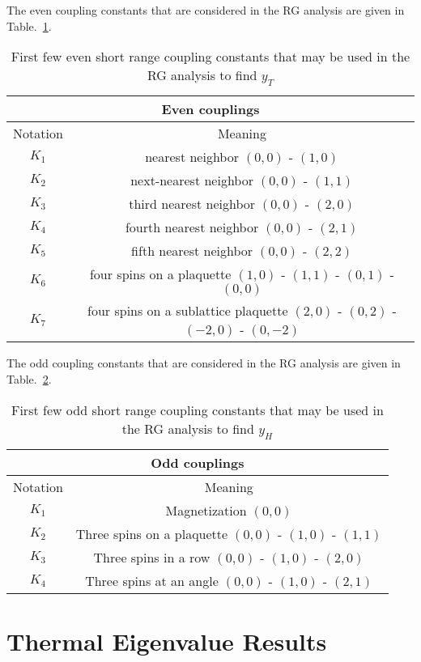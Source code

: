 \documentclass{article}
\begin{document}
The even coupling constants that are considered in the RG analysis
are given in Table.~\ref{even}. 

\begin{table}[H]
\centering
\begin{tabular}{|c |c|} 
 \hline
\multicolumn{2}{|c|}{Even couplings} \\ 
 \hline
 Notation & Meaning\\
 \hline
 $K_1$ & nearest neighbor $(0,0)$ - $(1,0)$\\
 $K_2$ & next-nearest neighbor $(0,0)$ - $(1,1)$\\
 $K_3$ & third nearest neighbor $(0,0)$ - $(2,0)$\\
 $K_4$ & fourth nearest neighbor $(0,0)$ - $(2,1)$\\
 $K_5$ & fifth nearest neighbor $(0,0)$ - $(2,2)$\\
  $K_6$ & four spins on a plaquette $(1,0)$ - $(1,1)$ - $(0,1)$ - $(0,0)$\\
 $K_7$ & four spins on a sublattice plaquette $(2,0)$ - $(0,2)$ - $(-2,0)$ - $(0,-2)$\\
 \hline
 \end{tabular}
 \caption{\label{even}First few even short range coupling constants that may be used in the RG analysis to find $y_T$}
\end{table}

The odd coupling constants that are considered in the RG analysis
are given in Table.~\ref{odd}. 

\begin{table}[H]
\centering
\begin{tabular}{|c |c|} 
 \hline
\multicolumn{2}{|c|}{Odd couplings} \\ 
 \hline
 Notation & Meaning\\
 \hline
 $K_1$ & Magnetization $(0,0)$\\
 $K_2$ & Three spins on a plaquette $(0,0)$ - $(1,0)$ - $(1,1)$\\
 $K_3$ & Three spins in a row $(0,0)$ - $(1,0)$ - $(2,0)$\\
 $K_4$ & Three spins at an angle $(0,0)$ - $(1,0)$ - $(2,1)$\\
 \hline
 \end{tabular}
 \caption{\label{odd}First few odd short range coupling constants that may be used in the RG analysis to find $y_H$}
\end{table}

\section{Thermal Eigenvalue Results}
\end{document}
